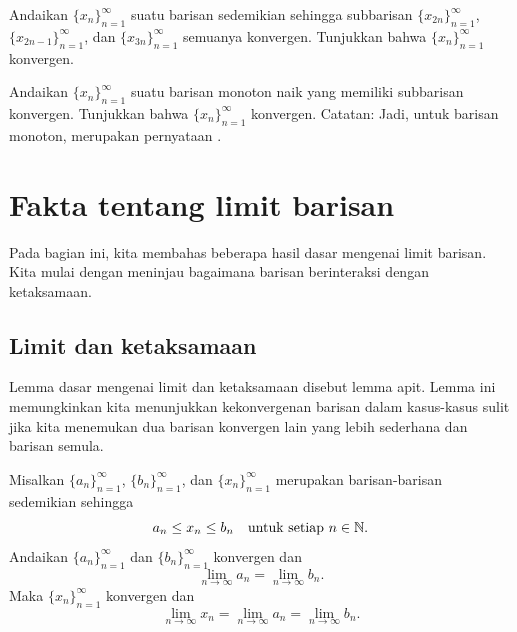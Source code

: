 \begin{exercise}
Andaikan $\{ x_n \}_{n=1}^\infty$ suatu barisan sedemikian sehingga
subbarisan $\{ x_{2n} \}_{n=1}^\infty$, $\{ x_{2n-1} \}_{n=1}^\infty$, dan
$\{ x_{3n} \}_{n=1}^\infty$ semuanya konvergen.  Tunjukkan bahwa $\{ x_n \}_{n=1}^\infty$ konvergen.
\end{exercise}

\begin{exercise}
Andaikan $\{ x_n \}_{n=1}^\infty$ suatu barisan monoton naik yang
memiliki subbarisan konvergen.
Tunjukkan bahwa $\{ x_n \}_{n=1}^\infty$ konvergen.
Catatan: Jadi, untuk barisan monoton,  merupakan pernyataan .
\end{exercise}


\sectionnewpage
\section{Fakta tentang limit barisan}
\label{sec:factslimsseqs}



Pada bagian ini, kita membahas beberapa hasil dasar mengenai limit
barisan.
Kita mulai dengan meninjau bagaimana barisan berinteraksi dengan ketaksamaan.

\subsection{Limit dan ketaksamaan}

Lemma dasar mengenai limit dan ketaksamaan disebut lemma apit.
Lemma ini memungkinkan kita menunjukkan kekonvergenan barisan dalam kasus-kasus sulit
jika kita menemukan dua barisan konvergen lain yang lebih sederhana dan 
 barisan semula.

\begin{lemma} \label{squeeze:lemma}
Misalkan $\{ a_n \}_{n=1}^\infty$, 
$\{ b_n \}_{n=1}^\infty$, dan 
$\{ x_n \}_{n=1}^\infty$ merupakan barisan-barisan sedemikian sehingga
\begin{equation*}
a_n \leq x_n \leq b_n \quad \text{untuk setiap } n \in {\mathbb{N}}.
\end{equation*}
Andaikan $\{ a_n \}_{n=1}^\infty$ dan $\{ b_n \}_{n=1}^\infty$ konvergen dan
\begin{equation*}
\lim_{n\to \infty} a_n
=
\lim_{n\to \infty} b_n .
\end{equation*}
Maka $\{ x_n \}_{n=1}^\infty$ konvergen dan
\begin{equation*}
\lim_{n\to \infty} x_n
=
\lim_{n\to \infty} a_n
=
\lim_{n\to \infty} b_n .
\end{equation*}
\end{lemma}

